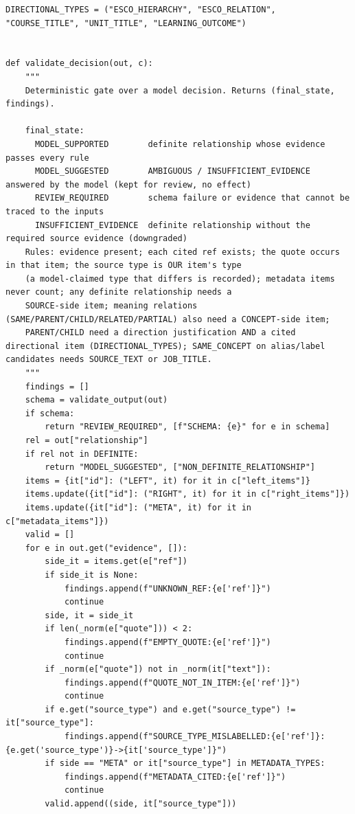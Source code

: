 \begin{lstlisting}[style=repo, firstnumber=280]
DIRECTIONAL_TYPES = ("ESCO_HIERARCHY", "ESCO_RELATION", "COURSE_TITLE", "UNIT_TITLE", "LEARNING_OUTCOME")


def validate_decision(out, c):
    """
    Deterministic gate over a model decision. Returns (final_state, findings).

    final_state:
      MODEL_SUPPORTED        definite relationship whose evidence passes every rule
      MODEL_SUGGESTED        AMBIGUOUS / INSUFFICIENT_EVIDENCE answered by the model (kept for review, no effect)
      REVIEW_REQUIRED        schema failure or evidence that cannot be traced to the inputs
      INSUFFICIENT_EVIDENCE  definite relationship without the required source evidence (downgraded)
    Rules: evidence present; each cited ref exists; the quote occurs in that item; the source type is OUR item's type
    (a model-claimed type that differs is recorded); metadata items never count; any definite relationship needs a
    SOURCE-side item; meaning relations (SAME/PARENT/CHILD/RELATED/PARTIAL) also need a CONCEPT-side item;
    PARENT/CHILD need a direction justification AND a cited directional item (DIRECTIONAL_TYPES); SAME_CONCEPT on alias/label candidates needs SOURCE_TEXT or JOB_TITLE.
    """
    findings = []
    schema = validate_output(out)
    if schema:
        return "REVIEW_REQUIRED", [f"SCHEMA: {e}" for e in schema]
    rel = out["relationship"]
    if rel not in DEFINITE:
        return "MODEL_SUGGESTED", ["NON_DEFINITE_RELATIONSHIP"]
    items = {it["id"]: ("LEFT", it) for it in c["left_items"]}
    items.update({it["id"]: ("RIGHT", it) for it in c["right_items"]})
    items.update({it["id"]: ("META", it) for it in c["metadata_items"]})
    valid = []
    for e in out.get("evidence", []):
        side_it = items.get(e["ref"])
        if side_it is None:
            findings.append(f"UNKNOWN_REF:{e['ref']}")
            continue
        side, it = side_it
        if len(_norm(e["quote"])) < 2:
            findings.append(f"EMPTY_QUOTE:{e['ref']}")
            continue
        if _norm(e["quote"]) not in _norm(it["text"]):
            findings.append(f"QUOTE_NOT_IN_ITEM:{e['ref']}")
            continue
        if e.get("source_type") and e.get("source_type") != it["source_type"]:
            findings.append(f"SOURCE_TYPE_MISLABELLED:{e['ref']}:{e.get('source_type')}->{it['source_type']}")
        if side == "META" or it["source_type"] in METADATA_TYPES:
            findings.append(f"METADATA_CITED:{e['ref']}")
            continue
        valid.append((side, it["source_type"]))

\end{lstlisting}
